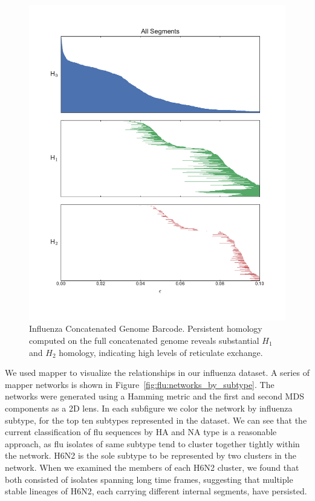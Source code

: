 \begin{figure}
\centering
\includegraphics[]{fig/influenza/flu_concat_barcode.pdf}
\caption[Influenza Concatenated Genome Barcode]{Influenza Concatenated Genome Barcode. Persistent homology computed on the full concatenated genome reveals substantial $H_1$ and $H_2$ homology, indicating high levels of reticulate exchange.}
\label{fig:flu:concatenated_genome_barcode}
\end{figure}

We used mapper to visualize the relationships in our influenza dataset.
A series of mapper networks is shown in Figure~\ref{fig:flu:networks_by_subtype}.
The networks were generated using a Hamming metric and the first and second MDS components as a 2D lens.
In each subfigure we color the network by influenza subtype, for the top ten subtypes represented in the dataset.
We can see that the current classification of flu sequences by HA and NA type is a reasonable approach, as flu isolates of same subtype tend to cluster together tightly within the network.
H6N2 is the sole subtype to be represented by two clusters in the network.
When we examined the members of each H6N2 cluster, we found that both consisted of isolates spanning long time frames, suggesting that multiple stable lineages of H6N2, each carrying different internal segments, have persisted.

